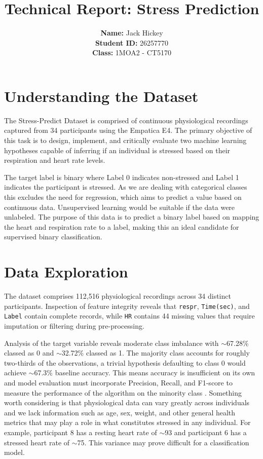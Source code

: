 \documentclass[10pt, a4paper]{article}
\title{\textbf{Technical Report: Stress Prediction}}
\author{
    \textbf{Name:} Jack Hickey \\
    \textbf{Student ID:} 26257770 \\
    \textbf{Class:} 1MOA2 - CT5170\\
}
\date{}
\begin{document}
\maketitle
\onehalfspacing

\section{Understanding the Dataset}
The Stress-Predict Dataset is comprised of continuous physiological recordings captured from 34 participants using the Empatica E4. The primary objective of this task is to design, implement, and critically evaluate two machine learning hypotheses capable of inferring if an individual is stressed based on their respiration and heart rate levels.

The target label is binary where Label 0 indicates non-stressed and Label 1 indicates the participant is stressed. As we are dealing with categorical classes this excludes the need for regression, which aims to predict a value based on continuous data. Unsupervised learning would be suitable if the data were unlabeled. The purpose of this data is to predict a binary label based on mapping the heart and respiration rate to a label, making this an ideal candidate for supervised binary classification. 

\section{Data Exploration}
The dataset comprises 112,516 physiological recordings across 34 distinct participants. Inspection of feature integrity reveals that \texttt{respr}, \texttt{Time(sec)}, and \texttt{Label} contain complete records, while \texttt{HR} contains 44 missing values that require imputation or filtering during pre-processing.

Analysis of the target variable reveals moderate class imbalance with $\sim$67.28\% classed as 0 and $\sim$32.72\% classed as 1. The majority class accounts for roughly two-thirds of the observations, a trivial hypothesis defaulting to class 0 would achieve $\sim$67.3\% baseline accuracy. This means accuracy is insufficient on its own and model evaluation must incorporate Precision, Recall, and F1-score to measure the performance of the algorithm on the minority class \parencite{he2009learning}. Something worth considering is that physiological data can vary greatly across individuals and we lack information such as age, sex, weight, and other general health metrics that may play a role in what constitutes stressed in any individual. For example, participant 8 has a resting heart rate of $\sim$93 and participant 6 has a stressed heart rate of $\sim$75. This variance may prove difficult for a classification model.
\end{document}
